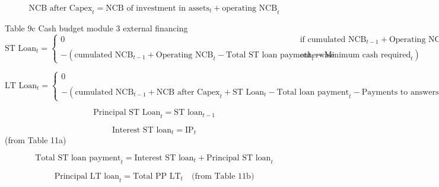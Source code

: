 \documentclass[12pt]{article}
\numberwithin{equation}{section}
\begin{document}
\begin{equation}
	\text{NCB after Capex}_{t} = \text{NCB of investment in assets}_{t} + \text{operating NCB}_{t}
\end{equation}


Table 9c Cash budget module 3 external financing
\begin{equation}
	\text{ST Loan}_{t} = 
	\begin{cases}
		0 & \text{if } \text{cumulated NCB}_{t-1} + \text{Operating NCB}_{t} - \text{Total ST loan payment}_{t} - \text{Minimum cash required}_{t} > 0 \\
		-\left(\text{cumulated NCB}_{t-1} + \text{Operating NCB}_{t} - \text{Total ST loan payment}_{t} - \text{Minimum cash required}_{t}\right) & \text{otherwise}
	\end{cases}
\end{equation}

\begin{equation}
	\text{LT Loan}_{t} = 
	\begin{cases}
		0 & \text{if } \text{cumulated NCB}_{t-1} + \text{NCB after Capex}_{t} + \text{ST Loan}_{t} - \text{Total loan payment}_{t} - \text{Payments to answers}_{t} + \text{Total inflow from ST investment}_{t} - \text{Minimum cash required}_{t} > 0 \\
		-\left(\text{cumulated NCB}_{t-1} + \text{NCB after Capex}_{t} + \text{ST Loan}_{t} - \text{Total loan payment}_{t} - \text{Payments to answers}_{t} + \text{Total inflow from ST investment}_{t} - \text{Minimum cash required}_{t}\right) \times \text{\% of financing with debt, the rest is financed by equity} & \text{otherwise}
	\end{cases}
\end{equation}

\begin{equation}
	\text{Principal ST Loan}_{t} = \text{ST loan}_{t-1}
\end{equation}

\begin{equation}
	\text{Interest ST loan}_{t} = \text{IP}_{t}
\end{equation}
(from Table 11a)

\begin{equation}
	\text{Total ST loan payment}_{t} = \text{Interest ST loan}_{t} + \text{Principal ST loan}_{t}
\end{equation}

\begin{equation}
	\text{Principal LT loan}_{t} = \text{Total PP LT}_{t} \quad \text{(from Table 11b)}
\end{equation}
\end{document}
